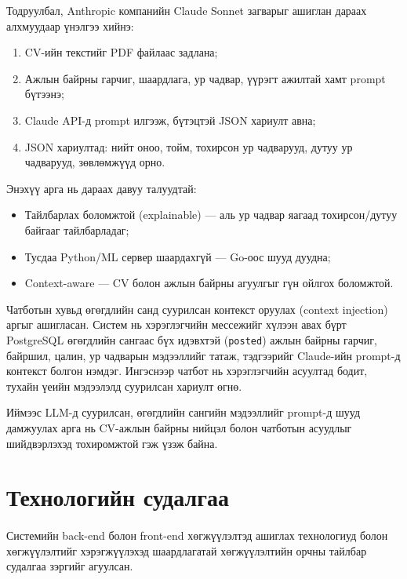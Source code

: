 \par{}Тодруулбал, Anthropic компанийн Claude Sonnet загварыг ашиглан дараах алхмуудаар үнэлгээ хийнэ:
\begin{enumerate}
    \item CV-ийн текстийг PDF файлаас задлана;
    \item Ажлын байрны гарчиг, шаардлага, ур чадвар, үүрэгт ажилтай хамт prompt бүтээнэ;
    \item Claude API-д prompt илгээж, бүтэцтэй JSON хариулт авна;
    \item JSON хариултад: нийт оноо, тойм, тохирсон ур чадварууд, дутуу ур чадварууд, зөвлөмжүүд орно.
\end{enumerate}

\par{}Энэхүү арга нь дараах давуу талуудтай:
\begin{itemize}
    \item Тайлбарлах боломжтой (explainable) — аль ур чадвар яагаад тохирсон/дутуу байгааг тайлбарладаг;
    \item Тусдаа Python/ML сервер шаардахгүй — Go-оос шууд дуудна;
    \item Context-aware — CV болон ажлын байрны агуулгыг гүн ойлгох боломжтой.
\end{itemize}

\par{}Чатботын хувьд өгөгдлийн санд суурилсан контекст оруулах (context injection) аргыг ашигласан. Систем нь хэрэглэгчийн мессежийг хүлээн авах бүрт PostgreSQL өгөгдлийн сангаас бүх идэвхтэй (\texttt{posted}) ажлын байрны гарчиг, байршил, цалин, ур чадварын мэдээллийг татаж, тэдгээрийг Claude-ийн prompt-д контекст болгон нэмдэг. Ингэснээр чатбот нь хэрэглэгчийн асуултад бодит, тухайн үеийн мэдээлэлд суурилсан хариулт өгнө.

\par{}Иймээс LLM-д суурилсан, өгөгдлийн сангийн мэдээллийг prompt-д шууд дамжуулах арга нь CV-ажлын байрны нийцэл болон чатботын асуудлыг шийдвэрлэхэд тохиромжтой гэж үзэж байна.


\section{Технологийн судалгаа}
\paragraph{} Системийн back-end болон front-end хөгжүүлэлтэд ашиглах технологиуд болон хөгжүүлэлтийг хэрэгжүүлэхэд шаардлагатай хөгжүүлэлтийн орчны тайлбар судалгаа зэргийг агуулсан.
